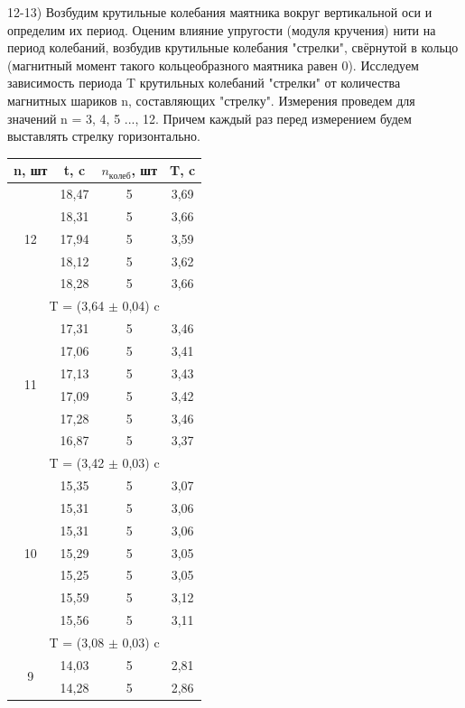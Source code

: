 \documentclass[a4paper,12pt]{article}
\begin{document}
12-13) Возбудим крутильные колебания маятника вокруг вертикальной оси и определим их период. Оценим влияние упругости (модуля кручения) нити на период колебаний, возбудив крутильные колебания "стрелки", свёрнутой в кольцо (магнитный момент такого кольцеобразного маятника равен 0). Исследуем зависимость периода T крутильных колебаний "стрелки" от количества магнитных шариков n, составляющих "стрелку". Измерения проведем для значений n = 3, 4, 5 ..., 12. Причем каждый раз перед измерением будем выставлять стрелку горизонтально. 

\begin{center}
\begin{tabular}{|c|c|c|c|}
	\hline
	n, шт & t, c & $n_{колеб}$, шт & T, c \\
	\hline
	\multirow{5}{*}{12} & 18,47 & 5 & 3,69 \\
	\cline{2-4} & 18,31 & 5 & 3,66 \\
	\cline{2-4} & 17,94 & 5 & 3,59 \\
	\cline{2-4} & 18,12 & 5 & 3,62 \\
	\cline{2-4} & 18,28 & 5 & 3,66 \\
	\hline
	\multicolumn{4}{|c|}{T = (3,64 $\pm$ 0,04) c} \\
	\hline
	\multirow{6}{*}{11} & 17,31 & 5 & 3,46 \\
	\cline{2-4} & 17,06 & 5 & 3,41 \\
	\cline{2-4} & 17,13 & 5 & 3,43 \\
	\cline{2-4} & 17,09 & 5 & 3,42 \\
	\cline{2-4} & 17,28 & 5 & 3,46 \\
	\cline{2-4} & 16,87 & 5 & 3,37 \\
	\hline
	\multicolumn{4}{|c|}{T = (3,42 $\pm$ 0,03) c} \\
	\hline
	\multirow{7}{*}{10} & 15,35 & 5 & 3,07 \\
	\cline{2-4} & 15,31 & 5 & 3,06 \\
	\cline{2-4} & 15,31 & 5 & 3,06 \\
	\cline{2-4} & 15,29 & 5 & 3,05 \\
	\cline{2-4} & 15,25 & 5 & 3,05 \\
	\cline{2-4} & 15,59 & 5 & 3,12 \\
	\cline{2-4} & 15,56 & 5 & 3,11 \\	
	\hline
	\multicolumn{4}{|c|}{T = (3,08 $\pm$ 0,03) c} \\
	\hline
	\multirow{6}{*}{9} & 14,03 & 5 & 2,81 \\
	\cline{2-4} & 14,28 & 5 & 2,86 \\

\end{tabular}
\end{center}
\end{document}
